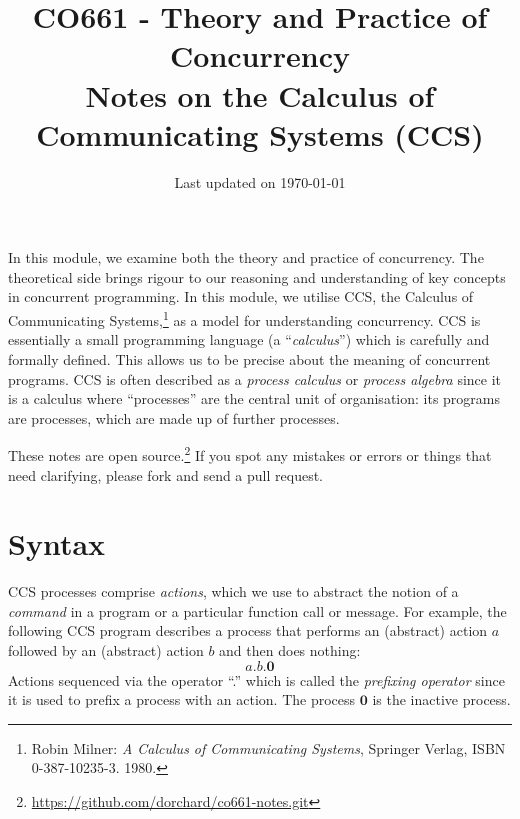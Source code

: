 \documentclass{article}
\title{\vspace{-3.5em}CO661 - Theory and Practice of Concurrency \\
{\Large{Notes on the Calculus of Communicating Systems (CCS)}}}
\date{\vspace{-2em}Last updated on \today}
\theoremstyle{definition}
\begin{document}
\maketitle{}
\vspace{-1em}

\noindent
In this module, we examine both the theory and practice of
concurrency. The theoretical side brings rigour to our reasoning and
understanding of key concepts in concurrent programming. In this
module, we utilise CCS, the Calculus of Communicating
Systems,\footnote{Robin Milner: \emph{A Calculus of Communicating
    Systems}, Springer Verlag, ISBN 0-387-10235-3. 1980.} as a model
for understanding concurrency. CCS is essentially a small programming
language (a ``\emph{calculus}'') which is carefully and formally
defined.  This allows us to be precise about the meaning of concurrent
programs. CCS is often described as a \emph{process calculus} or
\emph{process algebra} since it is a calculus where ``processes'' are
the central unit of organisation: its programs are processes,
which are made up of further processes.

These notes are open source.\footnote{\url{https://github.com/dorchard/co661-notes.git}} If you spot any
mistakes or errors or things that need clarifying, please fork and
send a pull request.

\tableofcontents

\section{Syntax}

CCS processes comprise \emph{actions}, which we use to abstract
the notion of a \emph{command} in a program or a particular function
call or message. For example, the following CCS program describes a process
that performs an (abstract) action $a$ followed by an (abstract)
action $b$ and then does nothing:
%
\begin{equation*}
  a . b . \mathbf{0}
\end{equation*}
%
Actions sequenced via the operator ``.'' which is called the
\emph{prefixing operator} since it is used to prefix a process
with an action. The process $\mathbf{0}$ is the inactive process.
\end{document}
